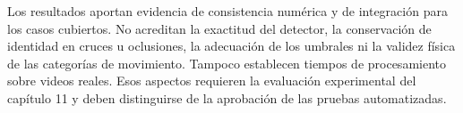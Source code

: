 Los resultados aportan evidencia de consistencia numérica y de integración para los casos cubiertos. No acreditan la exactitud del detector, la conservación de identidad en cruces u oclusiones, la adecuación de los umbrales ni la validez física de las categorías de movimiento. Tampoco establecen tiempos de procesamiento sobre videos reales. Esos aspectos requieren la evaluación experimental del capítulo 11 y deben distinguirse de la aprobación de las pruebas automatizadas.
